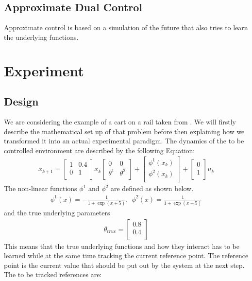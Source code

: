 \documentclass[10pt,letterpaper]{article}
\begin{document}
\subsection{Approximate Dual Control}
Approximate control is based on a simulation of the future that also tries to learn the underlying functions.
\section{Experiment}
\subsection{Design}
We are considering the example of a cart on a rail taken from \citep{klenske2015dual}. We will firstly describe the mathematical set up of that problem before then explaining how we transformed it into an actual experimental paradigm. The dynamics of the to be controlled environment are described by the following Equation:
\begin{align*}
x_{k+1}=\begin{bmatrix}
1 & 0.4\\
0 & 1\\
\end{bmatrix}
x_k
\begin{bmatrix}
0 & 0\\
\theta^1 & \theta^2\\
\end{bmatrix}
+
\begin{bmatrix}
\phi^1(x_k)\\
\phi^2(x_k)\\
\end{bmatrix}
+
\begin{bmatrix}
0\\
1\\
\end{bmatrix}
u_k
\end{align*}
The non-linear functions $\phi^1$ and $\phi^2$ are defined as shown below.
\begin{align*}
\phi^1(x)=-\frac{1}{1+\exp(x+5)},~~\phi^2(x)=\frac{1}{1+\exp(x+5)}
\end{align*}
 and the true underlying parameters
\begin{align*}
\theta_{true}=\begin{bmatrix}
0.8\\
0.4\\
\end{bmatrix}
\end{align*}
This means that the true underlying functions and how they interact has to be learned while at the same time tracking the current reference point. The reference point is the current value that should be put out by the system at the next step. The to be tracked references are:
\end{document}
